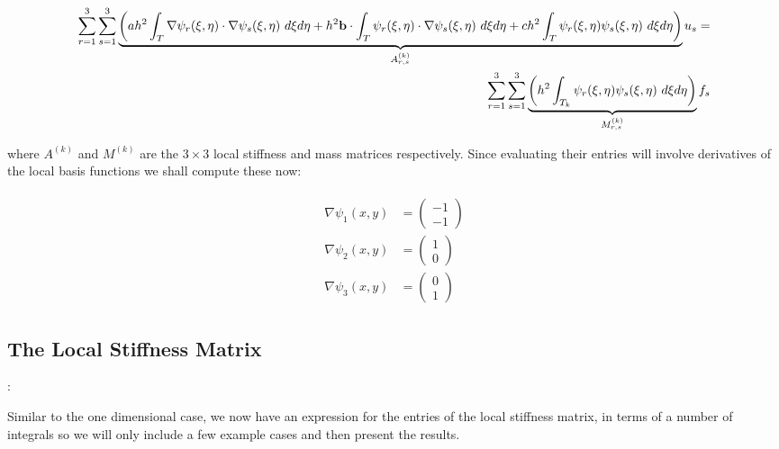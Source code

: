 \begin{align}\label{eq:twod-deterministic-discrete-local}
    \begin{split}
    \sum_{r=1}^3\sum_{s=1}^3\underbrace{
      \left(
        ah^2\int_{T}\nabla\psi_r(\xi, \eta)\cdot\nabla\psi_s(\xi, \eta)\ d\xi d\eta
        + h^2\v{b} \cdot \int_{T}\psi_r(\xi,\eta)\cdot\nabla\psi_s(\xi,\eta)\ d\xi d\eta
        + ch^2\int_{T}\psi_r(\xi,\eta)\psi_s(\xi,\eta)\ d\xi d\eta
      \right)}_{A^{(k)}_{r,s}}u_s = \\
    \sum_{r=1}^3\sum_{s=1}^3\underbrace{\left(
        h^2\int_{T_k}\psi_r(\xi,\eta)\psi_s(\xi,\eta)\ d\xi d\eta
    \right)}_{M^{(k)}_{r,s}}f_s
    \end{split}
\end{align}

where $A^{(k)}$ and $M^{(k)}$ are the $3 \times 3$ local stiffness and mass
matrices respectively. Since evaluating their entries will involve derivatives
of the local basis functions we shall compute these now:

\begin{align}
    \begin{split}
        \nabla\psi_1(x, y) &= \left(\begin{array}{c} -1 \\ -1 \end{array}\right) \\
        \nabla\psi_2(x, y) &= \left(\begin{array}{c} 1 \\ 0 \end{array}\right) \\
        \nabla\psi_3(x, y) &= \left(\begin{array}{c} 0 \\ 1 \end{array}\right)
    \end{split}
\end{align}

\subsection{The Local Stiffness Matrix}:\label{sec:twod-deterministic-local-stiffness}

Similar to the one dimensional case, we now have an expression for the entries
of the local stiffness matrix, in terms of a number of integrals
 so we will only include a few
example cases and then present the results.

